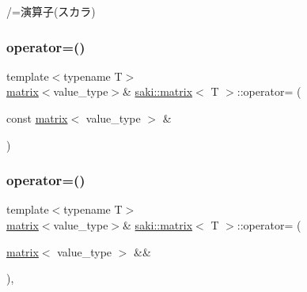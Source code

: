 /=演算子(スカラ) 

\mbox{\label{classsaki_1_1matrix_a38c5f7e666e3888d90b1c4017219f53f}} 
\subsubsection{\texorpdfstring{operator=()}{operator=()}\hspace{0.1cm}{\footnotesize\ttfamily [1/2]}}
{\footnotesize\ttfamily template$<$typename T$>$ \\
\mbox{\hyperlink{classsaki_1_1matrix}{matrix}}$<$value\+\_\+type$>$\& \mbox{\hyperlink{classsaki_1_1matrix}{saki\+::matrix}}$<$ T $>$\+::operator= (\begin{DoxyParamCaption}\item[{const \mbox{\hyperlink{classsaki_1_1matrix}{matrix}}$<$ value\+\_\+type $>$ \&}]{ }\end{DoxyParamCaption})\hspace{0.3cm}{\ttfamily [default]}}

\mbox{\label{classsaki_1_1matrix_a06a7330daf074554dada53978e3ccd55}} 
\subsubsection{\texorpdfstring{operator=()}{operator=()}\hspace{0.1cm}{\footnotesize\ttfamily [2/2]}}
{\footnotesize\ttfamily template$<$typename T$>$ \\
\mbox{\hyperlink{classsaki_1_1matrix}{matrix}}$<$value\+\_\+type$>$\& \mbox{\hyperlink{classsaki_1_1matrix}{saki\+::matrix}}$<$ T $>$\+::operator= (\begin{DoxyParamCaption}\item[{\mbox{\hyperlink{classsaki_1_1matrix}{matrix}}$<$ value\+\_\+type $>$ \&\&}]{ }\end{DoxyParamCaption})\hspace{0.3cm}{\ttfamily [default]}, {\ttfamily [noexcept]}}

\mbox{\label{classsaki_1_1matrix_a9438f349876b7932a5c3c58a713e3e00}} 
